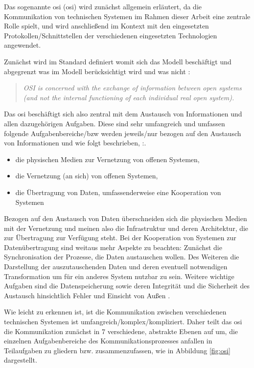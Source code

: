 Das sogenannte \acrlong{osi} (\acrshort{osi}) wird zunächst allgemein erläutert, da die Kommunikation von technischen Systemen im Rahmen dieser Arbeit eine zentrale Rolle spielt, und wird anschließend im Kontext mit den eingesetzten Protokollen/Schnittstellen der verschiedenen eingesetzten Technologien angewendet.

Zunächst wird im Standard definiert womit sich das Modell beschäftigt und abgegrenzt was im Modell berücksichtigt wird und was nicht \cite[S.~3]{osi96}:

\begin{quote}
\textit{\Gun OSI is concerned with the exchange of information between open systems (and not the internal functioning of each individual real open system).\Gob}
\end{quote}

Das \acrshort{osi} beschäftigt sich also zentral mit dem Austausch von Informationen und allen dazugehörigen Aufgaben. Diese sind sehr umfangreich und umfassen folgende Aufgabenbereiche/bzw werden jeweils/nur bezogen auf den Austausch von Informationen und wie folgt beschrieben, \cite[S.~3f.]{osi96}:.

\begin{itemize}
\item die physischen Medien zur Vernetzung von offenen Systemen,
\item die Vernetzung (an sich) von offenen Systemen,
\item die Übertragung von Daten, umfassenderweise eine Kooperation von Systemen
\end{itemize}

Bezogen auf den Austausch von Daten überschneiden sich die physischen Medien mit der Vernetzung und meinen also die Infrastruktur und deren Architektur, die zur Übertragung zur Verfügung steht. Bei der Kooperation von Systemen zur Datenübertragung sind weitaus mehr Aspekte zu beachten: Zunächst die Synchronisation der Prozesse, die Daten austauschen wollen. Des Weiteren die Darstellung der auszutauschenden Daten und deren eventuell notwendigen Transformation um für ein anderes System nutzbar zu sein. Weitere wichtige Aufgaben sind die Datenspeicherung sowie deren Integrität und die Sicherheit des Austausch hinsichtlich Fehler und Einsicht von Außen \cite[S.~4]{osi96}.

Wie leicht zu erkennen ist, ist die Kommunikation zwischen verschiedenen technischen Systemen ist umfangreich/komplex/kompliziert. Daher teilt das \acrshort{osi} die Kommunikation zunächst in 7 verschiedene, abstrakte Ebenen auf um, die einzelnen Aufgabenbereiche des Kommunikationsprozesses anfallen in Teilaufgaben zu gliedern bzw. zusammenzufassen, wie in Abbildung \ref{fig:osi} dargestellt.

